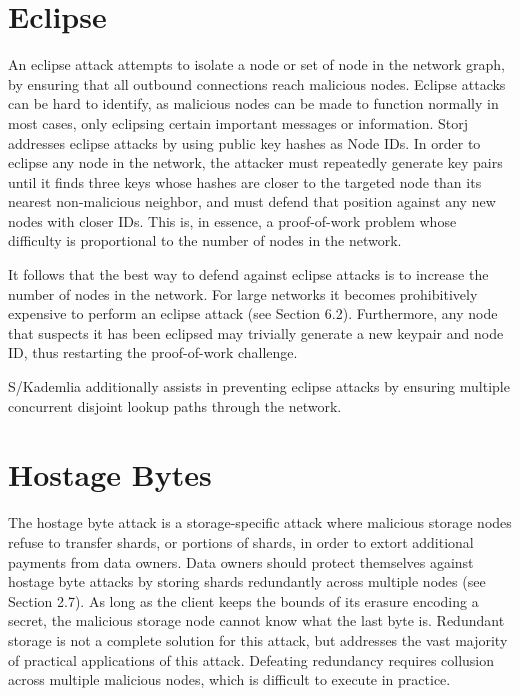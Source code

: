 \documentclass[11pt,fleqn,openany]{book}
\begin{document}
\section{Eclipse}

An eclipse attack attempts to isolate a node or set of node in the network
graph, by ensuring that all outbound connections reach malicious nodes. Eclipse
attacks can be hard to identify, as malicious nodes can be made to function
normally in most cases, only eclipsing certain important messages or
information. Storj addresses eclipse attacks by using public key hashes as Node
IDs. In order to eclipse any node in the network, the attacker must repeatedly
generate key pairs until it finds three keys whose hashes are closer to the
targeted node than its nearest non-malicious neighbor, and must defend that
position against any new nodes with closer IDs. This is, in essence, a
proof-of-work problem whose difficulty is proportional to the number of nodes in
the network.

It follows that the best way to defend against eclipse attacks is to increase
the number of nodes in the network. For large networks it becomes prohibitively
expensive to perform an eclipse attack (see Section 6.2). Furthermore, any node
that suspects it has been eclipsed may trivially generate a new keypair and node
ID, thus restarting the proof-of-work challenge.

S/Kademlia additionally assists in preventing eclipse attacks by ensuring
multiple concurrent disjoint lookup paths through the network.

\section{Hostage Bytes}

The hostage byte attack is a storage-specific attack where malicious storage
nodes
refuse to transfer shards, or portions of shards, in order to extort additional
payments from data owners. Data owners should protect themselves against hostage
byte attacks by storing shards redundantly across multiple nodes (see Section
2.7). As long as the client keeps the bounds of its erasure encoding a secret,
the malicious storage node cannot know what the last byte is. Redundant storage
is not
a complete solution for this attack, but addresses the vast majority of
practical applications of this attack. Defeating redundancy requires collusion
across multiple malicious nodes, which is difficult to execute in practice.
\end{document}
